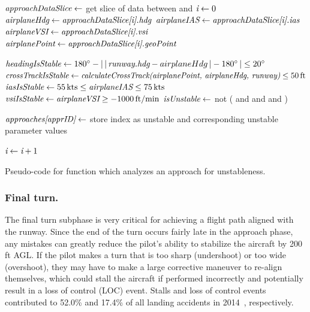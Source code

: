         
        \begin{algorithm}
            \begin{algorithmic}[1]\raggedright
                \State $ \textit{approachDataSlice} \gets $ get slice of data between  and 
                \State $ \textit{i} \gets 0 $
                    \State $ \textit{airplaneHdg} \gets \textit{approachDataSlice[i].hdg} $
                    \State $ \textit{airplaneIAS} \gets \textit{approachDataSlice[i].ias} $
                    \State $ \textit{airplaneVSI} \gets \textit{approachDataSlice[i].vsi} $
                    \State $ \textit{airplanePoint} \gets \textit{approachDataSlice[i].geoPoint} $

                    \State $ \textit{headingIsStable} \gets 180^\circ - \left|\,\left|\,\textit{runway.hdg} - airplaneHdg\,\right| - 180^\circ\,\right| \leq 20^\circ $
                    \State $ \var{crossTrackIsStable} \gets \var{calculateCrossTrack(} \break \var{airplanePoint, airplaneHdg, runway)} \leq 50\,\text{ft} $
                    \State $ \textit{iasIsStable} \gets 55\,\text{kts} \leq \textit{airplaneIAS} \leq 75\,\text{kts} $
                    \State $ \textit{vsiIsStable} \gets \textit{airplaneVSI} \geq -1000\,\text{ft/min} $
                    \State $ \textit{isUnstable} \gets $ not ( and  and  and )

                        \State $ \textit{approaches[apprID]} \gets $ store index as unstable and corresponding unstable parameter values
                    \EndIf

                    \State $ \textit{i} \gets \textit{i} + 1 $
                \EndWhile
            \EndFunction
            \end{algorithmic}
            \caption{Pseudo-code for function which analyzes an approach for unstableness.}
            \label{alg:analyze_approach}
        \end{algorithm}
        
        
        \subsubsection{Final turn.}
        
        	The final turn subphase is very critical for achieving a flight path aligned with the runway.  Since the end of the turn occurs fairly late in the approach phase, any mistakes can greatly reduce the pilot's ability to stabilize the aircraft by 200 ft AGL.  If the pilot makes a turn that is too sharp (undershoot) or too wide (overshoot), they may have to make a large corrective maneuver to re-align themselves, which could stall the aircraft if performed incorrectly and potentially result in a loss of control (LOC) event.  Stalls and loss of control events contributed to 52.0\% and 17.4\% of all landing accidents in 2014~\cite{kenny201726th}, respectively. 
            

